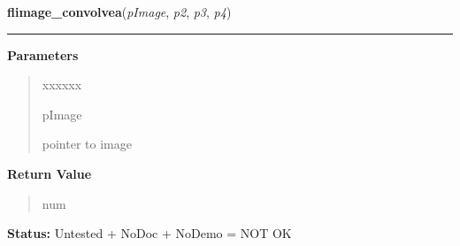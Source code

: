 \hspace{.8\funcindent}\begin{boxedminipage}{\funcwidth}

    \raggedright \textbf{flimage\_convolvea}(\textit{pImage}, \textit{p2}, \textit{p3}, \textit{p4})

    \vspace{-1.5ex}

    \rule{\textwidth}{0.5\fboxrule}
\setlength{\parskip}{2ex}
\setlength{\parskip}{1ex}
      \textbf{Parameters}
      \vspace{-1ex}

      \begin{quote}
        \begin{Ventry}{xxxxxx}

          \item[pImage]

          pointer to image

        \end{Ventry}

      \end{quote}

      \textbf{Return Value}
    \vspace{-1ex}

      \begin{quote}
      num

      \end{quote}

\textbf{Status:} Untested + NoDoc + NoDemo = NOT OK



    \end{boxedminipage}

    \label{xformslib:flflimage:flimage_tint}

    \vspace{0.5ex}

